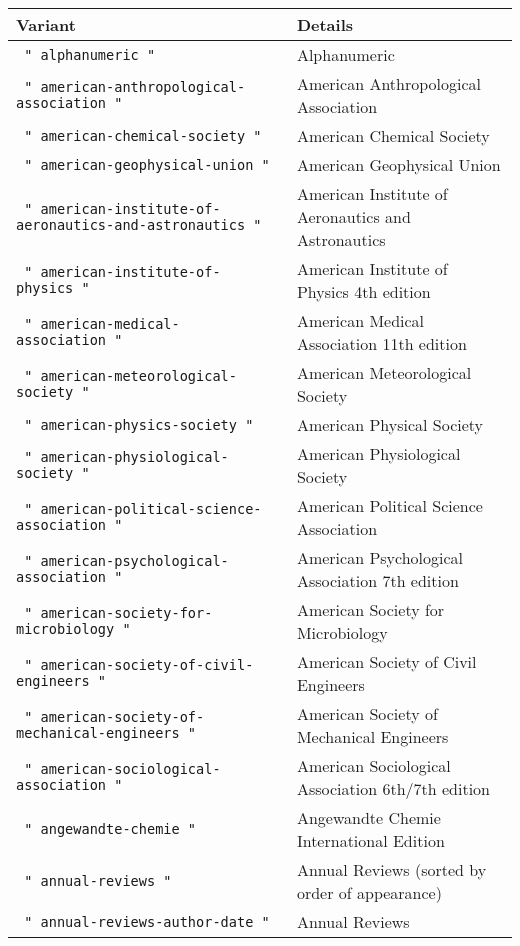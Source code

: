\begin{longtable}[]{@{}ll@{}}
\toprule\noalign{}
Variant & Details \\
\midrule\noalign{}
\endhead
\bottomrule\noalign{}
\endlastfoot
\texttt{\ "\ alphanumeric\ "\ } & Alphanumeric \\
\texttt{\ "\ american-anthropological-association\ "\ } & American
Anthropological Association \\
\texttt{\ "\ american-chemical-society\ "\ } & American Chemical
Society \\
\texttt{\ "\ american-geophysical-union\ "\ } & American Geophysical
Union \\
\texttt{\ "\ american-institute-of-aeronautics-and-astronautics\ "\ } &
American Institute of Aeronautics and Astronautics \\
\texttt{\ "\ american-institute-of-physics\ "\ } & American Institute of
Physics 4th edition \\
\texttt{\ "\ american-medical-association\ "\ } & American Medical
Association 11th edition \\
\texttt{\ "\ american-meteorological-society\ "\ } & American
Meteorological Society \\
\texttt{\ "\ american-physics-society\ "\ } & American Physical
Society \\
\texttt{\ "\ american-physiological-society\ "\ } & American
Physiological Society \\
\texttt{\ "\ american-political-science-association\ "\ } & American
Political Science Association \\
\texttt{\ "\ american-psychological-association\ "\ } & American
Psychological Association 7th edition \\
\texttt{\ "\ american-society-for-microbiology\ "\ } & American Society
for Microbiology \\
\texttt{\ "\ american-society-of-civil-engineers\ "\ } & American
Society of Civil Engineers \\
\texttt{\ "\ american-society-of-mechanical-engineers\ "\ } & American
Society of Mechanical Engineers \\
\texttt{\ "\ american-sociological-association\ "\ } & American
Sociological Association 6th/7th edition \\
\texttt{\ "\ angewandte-chemie\ "\ } & Angewandte Chemie International
Edition \\
\texttt{\ "\ annual-reviews\ "\ } & Annual Reviews (sorted by order of
appearance) \\
\texttt{\ "\ annual-reviews-author-date\ "\ } & Annual Reviews

\end{longtable}
